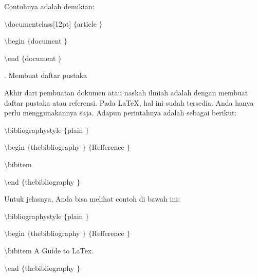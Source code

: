 \vspace{12pt}
Contohnya adalah demikian: \par
{\fontsize{10pt}{10pt}\selectfont  $  \setminus  $documentclass[12pt] $  \{  $article $  \}  $} \par
{\fontsize{10pt}{10pt}\selectfont  $  \setminus  $begin $  \{  $document $  \}  $} \par
\vspace{10pt}
{\fontsize{10pt}{10pt}\selectfont  $  \setminus  $end $  \{  $document $  \}  $} \par
\vspace{10pt}
\vspace{10pt}
. Membuat daftar pustaka \par
Akhir dari pembuatan dokumen atau naskah ilmiah adalah dengan membuat daftar pustaka atau referensi. Pada LaTeX, hal ini sudah tersedia. Anda hanya perlu menggunakannya saja. Adapun perintahnya adalah sebagai berikut: \par
{\fontsize{10pt}{10pt}\selectfont  $  \setminus  $bibliographystyle $  \{  $plain $  \}  $} \par
{\fontsize{10pt}{10pt}\selectfont  $  \setminus  $begin $  \{  $thebibliography $  \}  $ $  \{  $Refference $  \}  $} \par
{\fontsize{10pt}{10pt}\selectfont  $  \setminus  $bibitem} \par
{\fontsize{10pt}{10pt}\selectfont  $  \setminus  $end $  \{  $thebibliography $  \}  $} \par
\vspace{12pt}
Untuk jelasnya, Anda bisa melihat contoh di bawah ini: \par
{\fontsize{10pt}{10pt}\selectfont  $  \setminus  $bibliographystyle $  \{  $plain $  \}  $} \par
{\fontsize{10pt}{10pt}\selectfont  $  \setminus  $begin $  \{  $thebibliography $  \}  $ $  \{  $Refference $  \}  $} \par
{\fontsize{10pt}{10pt}\selectfont  $  \setminus  $bibitem A Guide to LaTex.} \par
{\fontsize{10pt}{10pt}\selectfont  $  \setminus  $end $  \{  $thebibliography $  \}  $} \par
\vspace{10pt}
